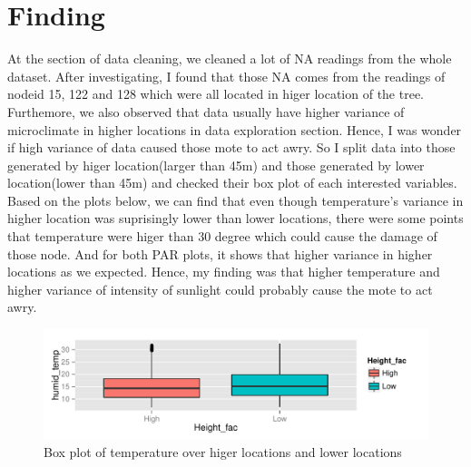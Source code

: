 \documentclass{article}\usepackage[]{graphicx}\usepackage[]{color}
\makeatletter
\def\maxwidth{ %
  \ifdim\Gin@nat@width>\linewidth
    \linewidth
  \else
    \Gin@nat@width
  \fi
}
\newenvironment{knitrout}{}{} %
\makeatother
\begin{document}
\section{Finding}
At the section of data cleaning, we cleaned a lot of NA readings from the whole dataset. After investigating, I found that those NA comes from the readings of nodeid 15, 122 and 128 which were all located in higer location of the tree. Furthemore, we also observed that data usually have higher variance of microclimate in higher locations in data exploration section. Hence, I was wonder if high variance of data caused those mote to act awry. So I split data into those generated by higer location(larger than 45m) and those generated by lower location(lower than 45m) and checked their box plot of each interested variables. Based on the plots below, we can find that even though temperature's variance in higher location was suprisingly lower than lower locations, there were some points that temperature were higer than 30 degree which could cause the damage of those node. And for both PAR plots, it shows that higher variance in higher locations as we expected. Hence, my finding was that higher temperature and higher variance of intensity of sunlight could probably cause the mote to act awry.
\begin{knitrout}
\color{fgcolor}\begin{figure}[h!]

{\centering \includegraphics[width=\maxwidth]{figure/addfigure21-1} 

}

\caption[Box plot of temperature over higer locations and lower locations]{Box plot of temperature over higer locations and lower locations}\label{fig:addfigure21}
\end{figure}


\end{knitrout}
\end{document}
